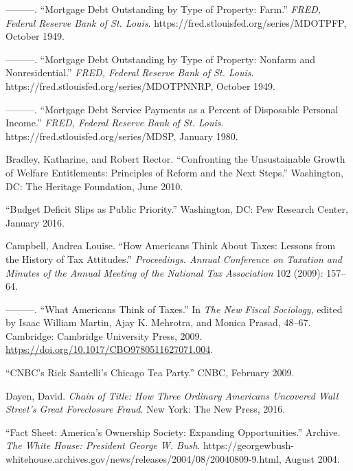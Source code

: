 \documentclass[
]{article}
\begin{document}
\leavevmode\hypertarget{ref-boardofgovernorsofthefederalreservesystemus1949mortgagea}{}%
---------. ``Mortgage Debt Outstanding by Type of Property: Farm.''
\emph{FRED, Federal Reserve Bank of St. Louis}.
https://fred.stlouisfed.org/series/MDOTPFP, October 1949.

\leavevmode\hypertarget{ref-boardofgovernorsofthefederalreservesystemus1949mortgageb}{}%
---------. ``Mortgage Debt Outstanding by Type of Property: Nonfarm and
Nonresidential.'' \emph{FRED, Federal Reserve Bank of St. Louis}.
https://fred.stlouisfed.org/series/MDOTPNNRP, October 1949.

\leavevmode\hypertarget{ref-boardofgovernorsofthefederalreservesystemus1980mortgage}{}%
---------. ``Mortgage Debt Service Payments as a Percent of Disposable
Personal Income.'' \emph{FRED, Federal Reserve Bank of St. Louis}.
https://fred.stlouisfed.org/series/MDSP, January 1980.

\leavevmode\hypertarget{ref-bradley2010confronting}{}%
Bradley, Katharine, and Robert Rector. ``Confronting the Unsustainable
Growth of Welfare Entitlements: Principles of Reform and the Next
Steps.'' Washington, DC: The Heritage Foundation, June 2010.

\leavevmode\hypertarget{ref-2016budget}{}%
``Budget Deficit Slips as Public Priority.'' Washington, DC: Pew
Research Center, January 2016.

\leavevmode\hypertarget{ref-campbell2009how}{}%
Campbell, Andrea Louise. ``How Americans Think About Taxes: Lessons from
the History of Tax Attitudes.'' \emph{Proceedings. Annual Conference on
Taxation and Minutes of the Annual Meeting of the National Tax
Association} 102 (2009): 157--64.

\leavevmode\hypertarget{ref-campbell2009what}{}%
---------. ``What Americans Think of Taxes.'' In \emph{The New Fiscal
Sociology}, edited by Isaac William Martin, Ajay K. Mehrotra, and Monica
Prasad, 48--67. Cambridge: Cambridge University Press, 2009.
\url{https://doi.org/10.1017/CBO9780511627071.004}.

\leavevmode\hypertarget{ref-ricksantelliCNBCRickSantelli2009}{}%
``CNBC's Rick Santelli's Chicago Tea Party.'' CNBC, February 2009.

\leavevmode\hypertarget{ref-dayenChainTitleHow2016}{}%
Dayen, David. \emph{Chain of Title: How Three Ordinary Americans
Uncovered Wall Street's Great Foreclosure Fraud}. New York: The New
Press, 2016.

\leavevmode\hypertarget{ref-2004fact}{}%
``Fact Sheet: America's Ownership Society: Expanding Opportunities.''
Archive. \emph{The White House: President George W. Bush}.
https://georgewbush-whitehouse.archives.gov/news/releases/2004/08/20040809-9.html,
August 2004.
\end{document}
